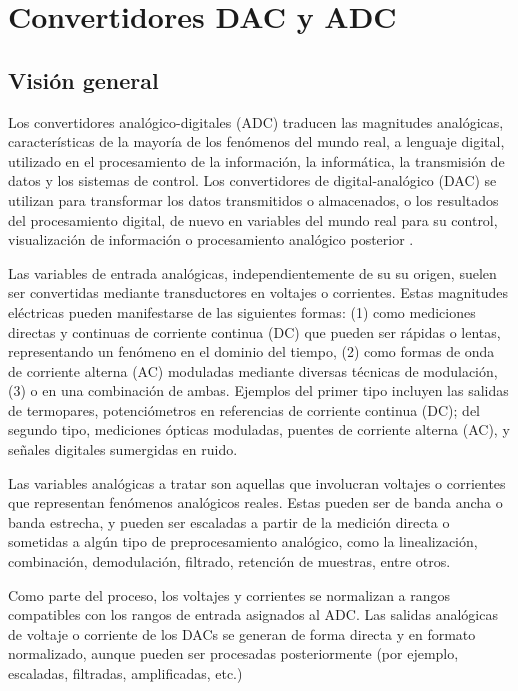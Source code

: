   \section{Convertidores DAC y ADC}

    \subsection{Visión general}

    Los convertidores analógico-digitales (ADC) traducen las magnitudes analógicas, características de la mayoría de los fenómenos del mundo real, a lenguaje digital, utilizado en el procesamiento de la información, la informática, la transmisión de datos y los sistemas de control. Los convertidores de digital-analógico (DAC) se utilizan para transformar los datos transmitidos o almacenados, o los resultados del procesamiento digital, de nuevo en variables del mundo real para su control, visualización de información o procesamiento analógico posterior \cite{Kester2007}.

    Las variables de entrada analógicas, independientemente de su su origen, suelen ser convertidas mediante transductores en voltajes o corrientes. Estas magnitudes eléctricas pueden manifestarse de las siguientes formas: (1) como mediciones directas y continuas de corriente continua (DC) que pueden ser rápidas o lentas, representando un fenómeno en el dominio del tiempo, (2) como formas de onda de corriente alterna (AC) moduladas mediante diversas técnicas de modulación, (3) o en una combinación de ambas. Ejemplos del primer tipo incluyen las salidas de termopares, potenciómetros en referencias de corriente continua (DC); del segundo tipo, mediciones ópticas moduladas, puentes de corriente alterna (AC), y señales digitales sumergidas en ruido.

    Las variables analógicas a tratar son aquellas que involucran voltajes o corrientes que representan fenómenos analógicos reales. Estas pueden ser de banda ancha o banda estrecha, y pueden ser escaladas a partir de la medición directa o sometidas a algún tipo de preprocesamiento analógico, como la linealización, combinación, demodulación, filtrado, retención de muestras, entre otros.

    Como parte del proceso, los voltajes y corrientes se normalizan a rangos compatibles con los rangos de entrada asignados al ADC. Las salidas analógicas de voltaje o corriente de los DACs se generan de forma directa y en formato normalizado, aunque pueden ser procesadas posteriormente (por ejemplo, escaladas, filtradas, amplificadas, etc.)

